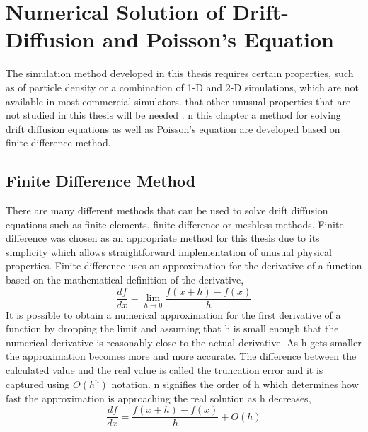 
\chapter{Numerical Solution of Drift-Diffusion and Poisson's Equation} %

\label{Chapter3} %

\begin{doublespace}

The simulation method developed in this thesis  requires certain properties, such as  of  particle density or a combination of 1-D and 2-D simulations, which are not  available in most commercial simulators.  that other unusual properties that are not studied in this thesis will be needed . n this chapter a method for solving drift diffusion equations as well as Poisson's equation are developed based on finite difference method.

\section{Finite Difference Method}
There are many different methods that can be used to solve drift diffusion equations such as finite elements\cite{FinEleTxt}, finite difference\cite{FinDifTxt} or meshless methods\cite{Meshless}. Finite difference was chosen as an appropriate method for this thesis due to its simplicity which allows straightforward implementation of unusual physical properties. Finite difference uses an approximation for the derivative of a function based on the mathematical definition of the derivative\cite{numerical2},
\begin{equation}
\frac{df}{dx}=\lim\limits_{h \rightarrow 0} \frac{f(x+h)-f(x)}{h}
\end{equation}
It is possible to obtain a numerical approximation for the first derivative of a function by dropping the limit and assuming that h is small enough that the numerical derivative is reasonably close to the actual derivative. As h gets smaller the approximation becomes more and more accurate. The difference between the calculated value and the real value is called the truncation error and it is captured using $O(h^n)$ notation. n signifies the order of h which determines how fast the approximation is approaching the real solution as h decreases\cite{numerical2},  
\begin{equation}
\frac{df}{dx}=\frac{f(x+h)-f(x)}{h} + O(h)
\label{numdif}
\end{equation}


\end{doublespace}
